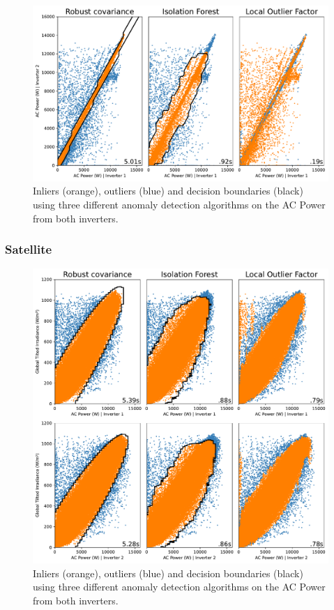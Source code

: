 \begin{figure}[h!]
    \centering
    \includegraphics[width=\textwidth]{figures/chapter5/cleaning/20_cleaning_power.pdf}
    \caption{Inliers (orange), outliers (blue) and decision boundaries (black) using three different anomaly detection algorithms on the AC Power from both inverters.}
    \label{fig:clean_power}
\end{figure}

\subsubsection{Satellite}

\begin{figure}[h!]
    \centering
    \includegraphics[width=\textwidth]{figures/chapter5/cleaning/21_cleaning_tilted_irrad.pdf}
    \caption{Inliers (orange), outliers (blue) and decision boundaries (black) using three different anomaly detection algorithms on the AC Power from both inverters.}
    \label{fig:clean_tilted_irrad}
\end{figure}

